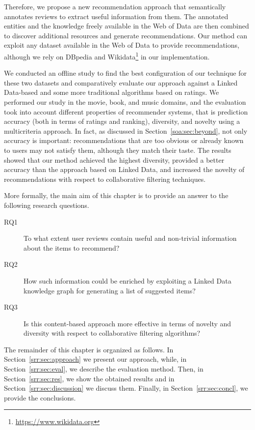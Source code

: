Therefore, we propose a new recommendation approach that semantically annotates reviews to extract useful information from them. The annotated entities and the knowledge freely available in the Web of Data are then combined to discover additional resources and generate recommendations. Our method can exploit any dataset available in the Web of Data to provide recommendations, although we rely on DBpedia and Wikidata\footnote{\url{https://www.wikidata.org}} in our implementation. 

We conducted an offline study to find the best configuration of our technique for these two datasets and comparatively evaluate our approach against a Linked Data-based and some more traditional algorithms based on ratings. We performed our study in the movie, book, and music domains, and the evaluation took into account different properties of recommender systems, that is prediction accuracy (both in terms of ratings and ranking), diversity, and novelty using a multicriteria approach. In fact, as discussed in Section~\ref{soa:sec:beyond}, not only accuracy is important: recommendations that are too obvious or already known to users may not satisfy them, although they match their taste. The results showed that our method achieved the highest diversity, provided a better accuracy than the approach based on Linked Data, and increased the novelty of recommendations with respect to collaborative filtering techniques.

More formally, the main aim of this chapter is to provide an answer to the following research questions.

\begin{description}
\item[RQ1] To what extent user reviews contain useful and non-trivial information about the items to recommend?
\item[RQ2] How such information could be enriched by exploiting a Linked Data knowledge graph for generating a list of suggested items?
\item[RQ3] Is this content-based approach more effective in terms of novelty and diversity with respect to collaborative filtering algorithms?
\end{description}

The remainder of this chapter is organized as follows. In Section~\ref{srr:sec:approach} we present our approach, while, in Section~\ref{srr:sec:eval}, we describe the evaluation method. Then, in Section~\ref{srr:sec:res}, we show the obtained results and in Section~\ref{srr:sec:discussion} we discuss them. Finally, in Section~\ref{srr:sec:concl}, we provide the conclusions.

